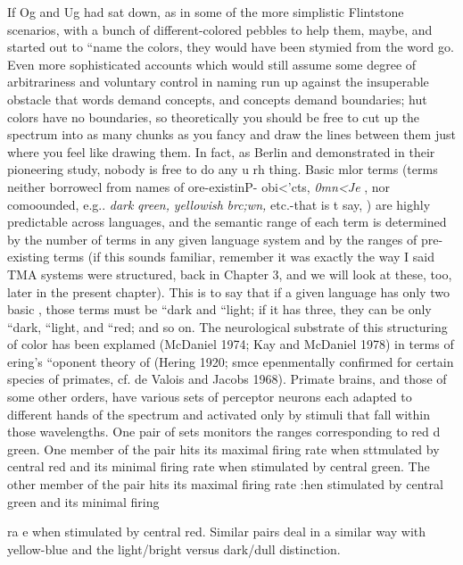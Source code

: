 If Og and Ug had sat down, as in some of the more simplistic Flintstone scenarios, with a bunch of different-colored pebbles to help them, maybe, and started out to ``name the colors, they would have been stymied from the word go. Even more sophisticated accounts which would still assume some degree of arbitrariness and voluntary control in naming run up against the insuperable obstacle that words demand concepts, and concepts demand boundaries; hut colors have no boundaries, so theoretically you should be free to cut up the spec\-trum into as many chunks as you fancy and draw the lines between them just where you feel like drawing them. In fact, as Berlin and \citet{Kay1969} demonstrated in their pioneering study, nobody is free to do any u rh thing. Basic mlor terms (terms neither borrowecl from names of ore-existinP- obi{\textless}'cts, \textit{0mn}\textit{{\textless}Je} , nor comoounded, e.g.. \textit{d}\textit{ark} \textit{qreen,} \textit{yellowish} \textit{br}\textit{c}\textit{;}\textit{wn,} etc.-that is t say, ) are highly predictable across languages, and the semantic range of each term is determined by the number of terms in any given language system and by the ranges of pre-existing terms (if this sounds familiar, remember it was exactly the way I said TMA systems were structured, back in Chapter 3, and we will look at these, too, later in the present chapter). This is to say that if a given language has only two basic , those terms must be ``dark and ``light{\textquotedbl}; if it has three, they can be only ``dark,{\textquotedbl} ``light, and ``red{\textquotedbl}; and so on.
The neurological substrate of this structuring of color has been explamed (McDaniel 1974; Kay and McDaniel 1978) in terms of ering's ``oponent theory of  (Hering 1920; smce epenmentally confirmed for certain species of primates, cf. de Valois and Jacobs 1968). Primate brains, and those of some other orders, have various sets of perceptor neurons each adapted to different hands of the spectrum and activated only by stimuli that fall within
those wavelengths. One pair of sets monitors the ranges corresponding to red d green. One member of the pair hits its maximal firing rate when sttmulated by central red and its minimal firing rate when stimu\-lated by central green. The other member of the pair hits its maximal firing rate :hen stimulated by central green and its minimal firing

ra e when stimulated by central red. Similar pairs deal in a similar way with yellow-blue and the light/bright versus dark/dull distinction.

